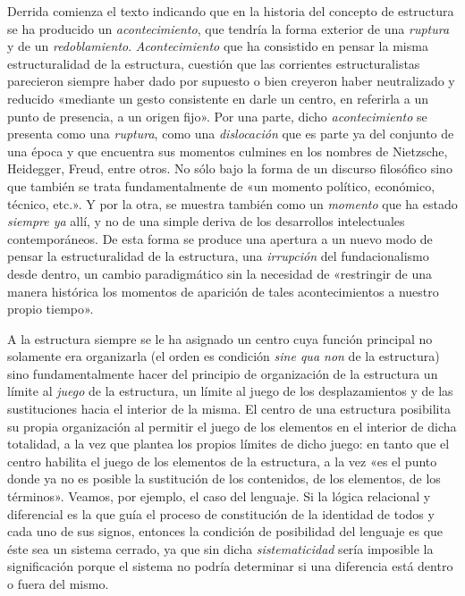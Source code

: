 Derrida comienza el texto indicando que en la historia del concepto de estructura se ha producido un \emph{acontecimiento}, que tendría la forma exterior de una \emph{ruptura }y de un \emph{redoblamiento}. \emph{Acontecimiento} que ha consistido en pensar la misma estructuralidad de la estructura, cuestión que las corrientes estructuralistas parecieron siempre haber dado por supuesto o bien creyeron haber neutralizado y reducido «mediante un gesto consistente en darle un centro, en referirla a un punto de presencia, a un origen fijo». Por una parte, dicho \emph{acontecimiento} se presenta como una \emph{ruptura}, como una \emph{dislocación} que es parte ya del conjunto de una época y que encuentra sus momentos culmines en los nombres de Nietzsche, Heidegger, Freud, entre otros. No sólo bajo la forma de un discurso filosófico sino que también se trata fundamentalmente de «un momento político, económico, técnico, etc.». Y por la otra, se muestra también como un \emph{momento} que ha estado \emph{siempre ya} allí, y no de una simple deriva de los desarrollos intelectuales contemporáneos. De esta forma se produce una apertura a un nuevo modo de pensar la estructuralidad de la estructura, una \emph{irrupción} del fundacionalismo desde dentro, un cambio paradigmático sin la necesidad de «restringir de una manera histórica los momentos de aparición de tales acontecimientos a nuestro propio tiempo».

A la estructura siempre se le ha asignado un centro cuya función principal no solamente era organizarla (el orden es condición \emph{sine qua non} de la estructura) sino fundamentalmente hacer del principio de organización de la estructura un límite al \emph{juego} de la estructura, un límite al juego de los desplazamientos y de las sustituciones hacia el interior de la misma. El centro de una estructura posibilita su propia organización al permitir el juego de los elementos en el interior de dicha totalidad, a la vez que plantea los propios límites de dicho juego: en tanto que el centro habilita el juego de los elementos de la estructura, a la vez «es el punto donde ya no es posible la sustitución de los contenidos, de los elementos, de los términos». Veamos, por ejemplo, el caso del lenguaje. Si la lógica relacional y diferencial es la que guía el proceso de constitución de la identidad de todos y cada uno de sus signos, entonces la condición de posibilidad del lenguaje es que éste sea un sistema cerrado, ya que sin dicha \emph{sistematicidad} sería imposible la significación porque el sistema no podría determinar si una diferencia está dentro o fuera del mismo.

